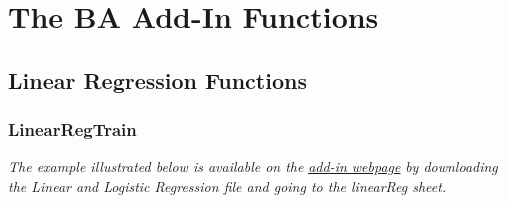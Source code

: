 \documentclass[12pt]{article}
\begin{document}
%
%
%
%
%
%
%
%
%
%
\section{The BA Add-In Functions}\label{list}

\subsection{Linear Regression Functions}

\subsubsection{LinearRegTrain}\label{regtrain}


\textit{The example illustrated below is available on the}  \href{https://www8.gsb.columbia.edu/bizanalytics/excel-add-in/multiplatform#h-4}{ \textit{add-in webpage}}
 \textit{by downloading the Linear and Logistic Regression file and going to the linearReg sheet.}
\end{document}
